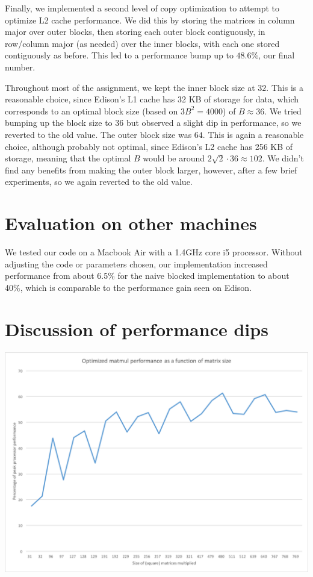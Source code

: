 \documentclass[12pt]{article}
\begin{document}
Finally, we implemented a second level of copy optimization to attempt to optimize L2 cache performance. We did this by storing the matrices in column major over outer blocks, then storing each outer block contiguously, in row/column major (as needed) over the inner blocks, with each one stored contiguously as before.
This led to a performance bump up to $48.6\%$, our final number.

Throughout most of the assignment, we kept the inner block size at $32$. This is a reasonable choice, since Edison's L1 cache has 32 KB of storage for data, which corresponds to an optimal block size (based on $3B^{2} = 4000$) of $B \approx 36$. We tried bumping up the block size to $36$ but observed a slight dip in
performance, so we reverted to the old value. The outer block size was $64$. This is again a reasonable choice, although probably not optimal, since Edison's L2 cache has 256 KB of storage, meaning that the optimal $B$ would be around $2\sqrt{2} \cdot 36 \approx 102$. We didn't find any benefits from making the outer
block larger, however, after a few brief experiments, so we again reverted to the old value.

\section{Evaluation on other machines}

We tested our code on a Macbook Air with a 1.4GHz core i5 processor. Without adjusting the code or parameters chosen, our implementation increased performance from about 6.5\% for the naive blocked implementation to about 40\%,  
which is comparable to the performance gain seen on Edison.

\section{Discussion of performance dips}

\begin{center}
\includegraphics[scale=0.5]{chart}
\end{center}
\end{document}
